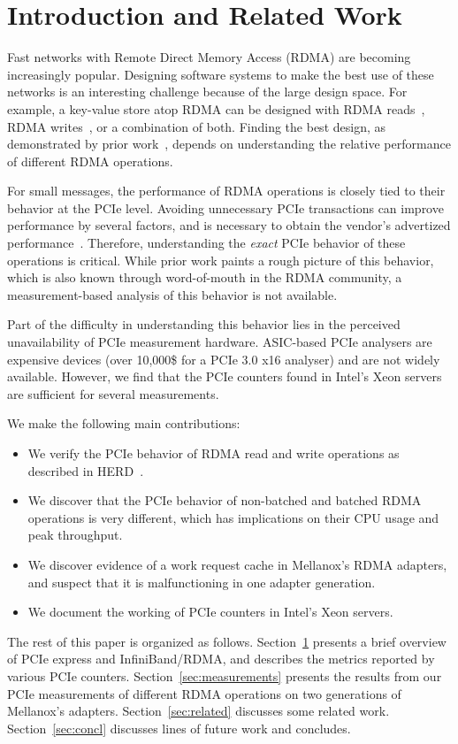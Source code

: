 \section{Introduction and Related Work}
\label{sec:intro}

Fast networks with Remote Direct Memory Access (RDMA) are becoming increasingly
popular.  Designing software systems to make the best use of these networks
is an interesting challenge because of the large design space. For example,
a key-value store atop RDMA can be designed with RDMA reads~\cite{Pilaf, FaRM},
RDMA writes~\cite{Kalia:sigcomm2014}, or a combination of both. Finding the
best design, as demonstrated by prior work~\cite{Kalia:sigcomm2014}, depends on
understanding the relative performance of different RDMA operations.

For small messages, the performance of RDMA operations is closely tied to their
behavior at the PCIe level. Avoiding unnecessary PCIe transactions can improve
performance by several factors, and is necessary to obtain the vendor's
advertized performance~\cite{Kalia:sigcomm2014}. Therefore, understanding the
\emph{exact} PCIe behavior of these operations is critical. While prior work
paints a rough picture of this behavior, which is also known through
word-of-mouth in the RDMA community, a measurement-based analysis of this
behavior is not available.

Part of the difficulty in understanding this behavior lies in the perceived
unavailability of PCIe measurement hardware. ASIC-based PCIe analysers are
expensive devices (over 10,000\$ for a PCIe 3.0 x16 analyser) and are not
widely available. However, we find that the PCIe counters found in Intel's
Xeon servers are sufficient for several measurements.

We make the following main contributions:
\begin{itemize}
\item We verify the PCIe behavior of RDMA read and write operations as
described in HERD~\cite{Kalia:sigcomm2014}.
\item We discover that the PCIe behavior of non-batched and batched RDMA
operations is very different, which has implications on their CPU usage and
peak throughput.
\item We discover evidence of a work request cache in Mellanox's RDMA adapters,
and suspect that it is malfunctioning in one adapter generation.
\item We document the working of PCIe counters in Intel's Xeon servers.
\end{itemize}

The rest of this paper is organized as follows. Section~\ref{sec:intro} presents
a brief overview of PCIe express and InfiniBand/RDMA, and describes the
metrics reported by various PCIe counters. Section~\ref{sec:measurements}
presents the results from our PCIe measurements of different RDMA operations
on two generations of Mellanox's adapters. Section~\ref{sec:related} discusses
some related work. Section~\ref{sec:concl} discusses lines of future work and
concludes.
